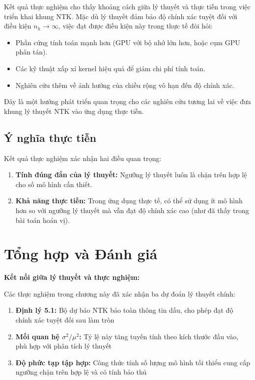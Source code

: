 Kết quả thực nghiệm cho thấy khoảng cách giữa lý thuyết và thực tiễn trong việc triển khai khung NTK. Mặc dù lý thuyết đảm bảo độ chính xác tuyệt đối với điều kiện $n_h \rightarrow \infty$, việc đạt được điều kiện này trong thực tế đòi hỏi:
\begin{itemize}
    \item Phần cứng tính toán mạnh hơn (GPU với bộ nhớ lớn hơn, hoặc cụm GPU phân tán).
    \item Các kỹ thuật xấp xỉ kernel hiệu quả để giảm chi phí tính toán.
    \item Nghiên cứu thêm về ảnh hưởng của chiều rộng vô hạn đến độ chính xác.
\end{itemize}

Đây là một hướng phát triển quan trọng cho các nghiên cứu tương lai về việc đưa khung lý thuyết NTK vào ứng dụng thực tiễn.

\subsection{Ý nghĩa thực tiễn}

Kết quả thực nghiệm xác nhận hai điều quan trọng:

\begin{enumerate}
    \item \textbf{Tính đúng đắn của lý thuyết:} Ngưỡng lý thuyết luôn là chặn trên hợp lệ cho số mô hình cần thiết.
    \item \textbf{Khả năng thực tiễn:} Trong ứng dụng thực tế, có thể sử dụng ít mô hình hơn so với ngưỡng lý thuyết mà vẫn đạt độ chính xác cao (như đã thấy trong bài toán hoán vị).
\end{enumerate}

\section{Tổng hợp và Đánh giá}

\textbf{Kết nối giữa lý thuyết và thực nghiệm:}

\vspace{0.2cm}

Các thực nghiệm trong chương này đã xác nhận ba dự đoán lý thuyết chính:
\begin{enumerate}
    \item \textbf{Định lý 5.1:} Bộ dự báo NTK bảo toàn thông tin dấu, cho phép đạt độ chính xác tuyệt đối sau làm tròn
    \item \textbf{Mối quan hệ $\sigma^2/\mu^2$:} Tỷ lệ này tăng tuyến tính theo kích thước đầu vào, phù hợp với phân tích lý thuyết
    \item \textbf{Độ phức tạp tập hợp:} Công thức tính số lượng mô hình tối thiểu cung cấp ngưỡng chặn trên hợp lệ và có tính bảo thủ
\end{enumerate}

